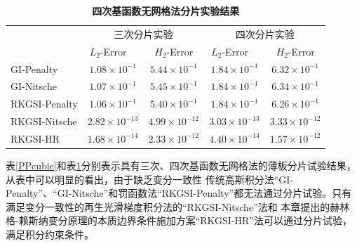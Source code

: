 \begin{table}[H]
    \caption{\textbf{四次基函数无网格法分片实验结果}}
    \centering\label{PPquartic}
   \begin{tabular}{lcccc}
   \toprule
   & \multicolumn{2}{c}{三次分片实验} & \multicolumn{2}{c}{四次分片实验} \\ \cline{2-5}
   &$L_2$-Error$\quad$&$H_2$-Error&$L_2$-Error$\quad$&$H_2$-Error\\
   \midrule
   GI-Penalty&$1.08\times10^{-1}$&$5.44\times10^{-1}$&$1.84\times10^{-1}$&$6.32\times10^{-1}$\\
   GI-Nitsche&$1.07\times10^{-1}$&$5.45\times10^{-1}$&$1.84\times10^{-1}$&$6.34\times10^{-1}$\\
  RKGSI-Penalty&$1.06\times10^{-1}$&$5.40\times10^{-1}$&$1.84\times10^{-1}$&$6.26\times10^{-1}$\\
  RKGSI-Nitsche&$2.82\times10^{-13}$&$4.99\times10^{-12}$&$3.03\times10^{-13}$&$3.33\times10^{-12}$\\
  RKGSI-HR&$1.68\times10^{-14}$&$2.33\times10^{-12}$&$4.40\times10^{-14}$&$1.57\times10^{-12}$\\
\bottomrule
\end{tabular}
\end{table}\par
表\ref{PPcubic}和表\ref{PPquartic}分别表示具有三次、四次基函数无网格法的薄板分片试验结果，从表中可以明显的看出，由于缺乏变分一致性
传统高斯积分法“GI-Penalty”、“GI-Nitsche”和罚函数法“RKGSI-Penalty”都无法通过分片试验。只有满足变分一致性的再生光滑梯度积分法的“RKGSI-Nitsche”法和
本章提出的赫林格-赖斯纳变分原理的本质边界条件施加方案“RKGSI-HR”法可以通过分片试验，满足积分约束条件。
